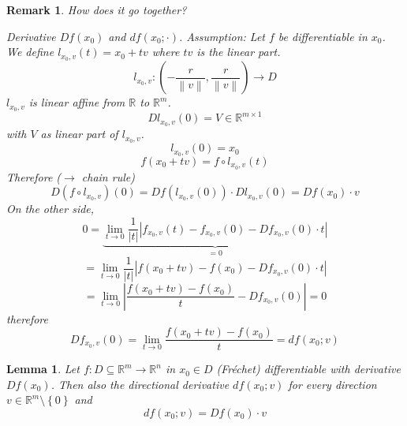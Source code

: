 \documentclass{article}
\newtheorem{lemma}{Lemma}  \numberwithin{lemma}{section}
\newtheorem{remark}{Remark}  \numberwithin{remark}{section}
\newcommand{\set}[1]{\left\{#1\right\}}
\newcommand{\norm}[1]{\left\|#1\right\|}
\newcommand{\card}[1]{\left|#1\right|}
\begin{document}
\begin{remark}
  How does it go together?
  
  Derivative $Df(x_0)$ and $df(x_0; \cdot)$.
  Assumption: Let $f$ be differentiable in $x_0$.
  We define $l_{x_0,v}(t) = x_0 + tv$
  where $tv$ is the linear part.
  \[ l_{x_0,v}: \left(-\frac{r}{\norm{v}}, \frac{r}{\norm{v}}\right) \to D \]
  $l_{x_0,v}$ is linear affine from $\mathbb R$ to $\mathbb R^m$.
  \[ Dl_{x_0,v}(0) = V \in \mathbb R^{m \times 1} \]
  with $V$ as linear part of $l_{x_0,v}$.
  \[ l_{x_0, v}(0) = x_0 \]
  \[ f(x_0 + tv) = f \circ l_{x_0,v}(t) \]
  Therefore ($\to$ chain rule)
  \[ D(f \circ l_{x_0,v})(0) = Df(l_{x_0,v}(0)) \cdot Dl_{x_0,v}(0) = Df(x_0) \cdot v \]
  On the other side,
  \[ 0 = \underbrace{\lim_{t\to 0} \frac{1}{\card{t}} \card{f_{x_0,v}(t) - f_{x_0,v}(0) - Df_{x_0,v}(0) \cdot t}}_{=0} \]
  \[ = \lim_{t\to0} \frac{1}{\card{t}} \card{f(x_0 + tv) - f(x_0) - Df_{x_0,v}(0) \cdot t} \]
  \[ = \lim_{t\to0} \card{\frac{f(x_0 + tv) - f(x_0)}{t} - Df_{x_0,v}(0)} = 0 \]
  therefore
  \[ Df_{x_0,v}(0) = \lim_{t\to 0} \frac{f(x_0 + tv) - f(x_0)}{t} = df(x_0;v) \]
\end{remark}

\begin{lemma} %
  Let $f: D \subseteq \mathbb R^m \to \mathbb R^n$ in $x_0 \in D$ (Fr\'echet) differentiable with derivative $Df(x_0)$.
  Then also the directional derivative $df(x_0; v)$ for every direction $v \in \mathbb R^m \setminus \set{0}$ and %
  \[ df(x_0; v) = Df(x_0) \cdot v \]
\end{lemma}
\end{document}
